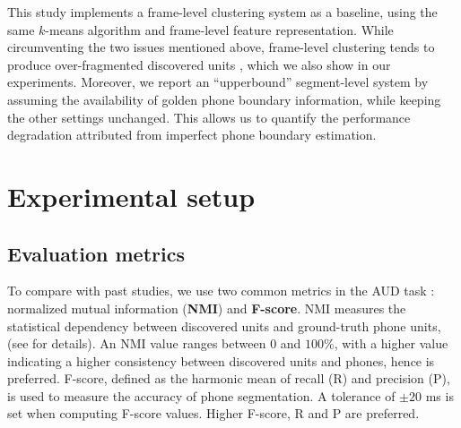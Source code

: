 \documentclass[a4paper]{article}
\begin{document}
This study implements a frame-level clustering system as a baseline, using the same  $k$-means algorithm and frame-level feature representation. While circumventing the two issues   mentioned above,   frame-level clustering  tends to produce over-fragmented discovered units \cite{wu2018optimizing,feng2019_TASLP}, which we also show in our experiments.  
Moreover, we report an ``upperbound'' segment-level system by assuming the availability of golden phone  boundary information, while keeping the other settings unchanged. This allows us to quantify the performance degradation attributed from imperfect  phone boundary estimation.


\section{Experimental setup}
\label{sec:setup}
\subsection{Evaluation metrics}
\label{subsec:setup_eval}
To compare with  past studies, 
we use two common metrics in the AUD task \cite{ondel2016variational,Ebbers2017,Yusuf2020hierarchical}: 
normalized mutual information (\textbf{NMI})  \cite{cover1999elements} and \textbf{F-score}. NMI   measures the statistical dependency between discovered units and ground-truth phone units,  (see \cite{Yusuf2020hierarchical} for details). An NMI value ranges between $0$  and $100\%$, with a higher value  indicating a higher consistency between discovered units and phones, hence is preferred. F-score, defined as the harmonic mean of recall (R) and precision (P),  is used to measure  the accuracy of  phone segmentation. A tolerance of $\pm20$ ms is set \cite{Yusuf2020hierarchical} when computing F-score values. Higher F-score, R and P   are preferred. %
\end{document}
